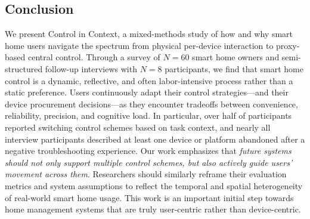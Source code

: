 \subsection{Conclusion}
\label{cic:sec:conclusion}

We present Control in Context, a mixed-methods study of how and why smart home users navigate the spectrum from physical per-device interaction to proxy-based central control. Through a survey of $N=60$ smart home owners and semi-structured follow-up interviews with $N=8$ participants, we find that smart home control is a dynamic, reflective, and often labor-intensive process rather than a static preference. Users continuously adapt their control strategies---and their device procurement decisions---as they encounter tradeoffs between convenience, reliability, precision, and cognitive load. In particular, over half of participants reported switching control schemes based on task context, and nearly all interview participants described at least one device or platform abandoned after a negative troubleshooting experience. Our work emphasizes that \textit{future systems should not only support multiple control schemes, but also actively guide users' movement across them}. Researchers should similarly reframe their evaluation metrics and system assumptions to reflect the temporal and spatial heterogeneity of real-world smart home usage. This work is an important initial step towards home management systems that are truly user-centric rather than device-centric.
